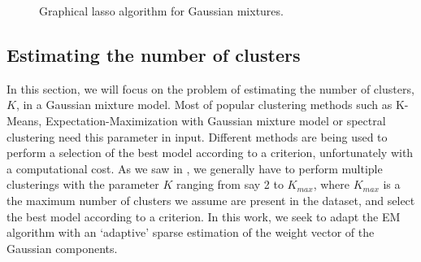 \begin{figure}
\begin{center}
   \caption{Graphical lasso algorithm for Gaussian mixtures.}
   \label{algo:graph_lasso_EM}
\end{center}
\end{figure}

\subsection{Estimating the number of clusters}
\label{estim_nb_clusters_sect}

In this section, we will focus on the problem of estimating the number of clusters, $K$, in a Gaussian mixture model. Most of popular clustering methods such as K-Means, Expectation-Maximization with Gaussian mixture model or spectral clustering need this parameter in input. Different methods are being used to perform a selection of the best model according to a criterion, unfortunately with a computational cost. As we saw in , we generally have to perform multiple clusterings with the parameter $K$ ranging from say 2 to $K_{max}$, where $K_{max}$ is a the maximum number of clusters we assume are present in the dataset, and select the best model according to a criterion. In this work, we seek to adapt the EM algorithm with an `adaptive' sparse estimation of the weight vector of the Gaussian components.
